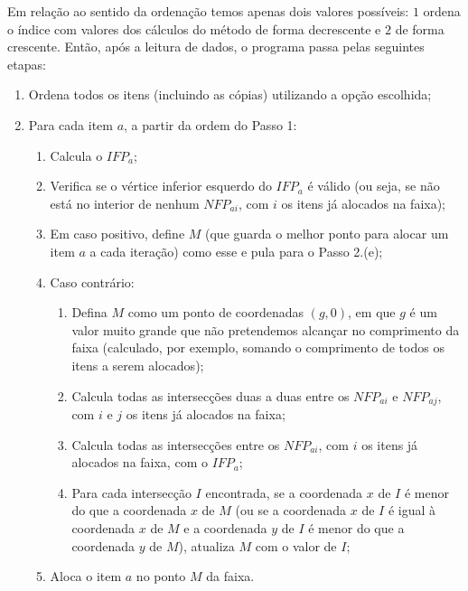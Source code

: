 \documentclass[12pt, openright, twoside, a4paper, english, brazilian]{USPSC-classe/USPSC}
\begin{document}
Em relação ao sentido da ordenação temos apenas dois valores possíveis: $1$ ordena o índice com valores dos cálculos do método de forma decrescente e $2$ de forma crescente. Então, após a leitura de dados, o programa passa pelas seguintes etapas:
\begin{enumerate}
    \item Ordena todos os itens (incluindo as cópias) utilizando a opção escolhida;
    \item Para cada item $a$, a partir da ordem do Passo 1:
    \begin{enumerate}
        \item Calcula o $IFP_a$;
        \item Verifica se o vértice inferior esquerdo do $IFP_a$ é válido (ou seja, se não está no interior de nenhum $NFP_{ai}$, com $i$ os itens já alocados na faixa);
        \item Em caso positivo, define $M$ (que guarda o melhor ponto para alocar um item $a$ a cada iteração) como esse e pula para o Passo 2.(e);
        \item Caso contrário:
        \begin{enumerate}
            \item Defina $M$ como um ponto de coordenadas $(g,0)$, em que $g$ é um valor muito grande que não pretendemos alcançar no comprimento da faixa (calculado, por exemplo, somando o comprimento de todos os itens a serem alocados);
            \item Calcula todas as intersecções duas a duas entre os $NFP_{ai}$ e $NFP_{aj}$, com $i$ e $j$ os itens já alocados na faixa;
            \item Calcula todas as intersecções entre os $NFP_{ai}$, com $i$ os itens já alocados na faixa, com o $IFP_a$;
            \item Para cada intersecção $I$ encontrada, se a coordenada $x$ de $I$ é menor do que a coordenada $x$ de $M$ (ou se a coordenada $x$ de $I$ é igual à coordenada $x$ de $M$ e a coordenada $y$ de $I$ é menor do que a coordenada $y$ de $M$), atualiza $M$ com o valor de $I$;
        \end{enumerate}
        \item Aloca o item $a$ no ponto $M$ da faixa.
    \end{enumerate}
\end{enumerate}

\end{document}
